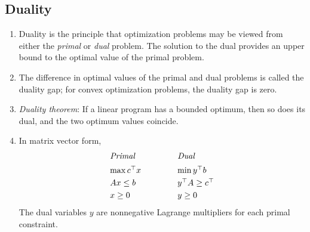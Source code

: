 \documentclass[10pt]{article}
\begin{document}
\begin{multicols}{2}
\begin{addmargin}[0.8em]{0.5em}
    \subsection{Duality}
    \vspace{-0.2cm}
    \begin{enumerate}[label=(\alph*)]
        \item Duality is the principle that optimization problems may be viewed from either the \textit{primal} or \textit{dual} problem. The solution to the dual provides an upper bound to the optimal value of the primal problem.
        \item The difference in optimal values of the primal and dual problems is called the duality gap; for convex optimization problems, the duality gap is zero.
        \item \textit{Duality theorem}: If a linear program has a bounded optimum, then so does its dual, and the two optimum values coincide.
        \item In matrix vector form,
        \begin{align*}
        \begin{tabular}[t]{ll}
        \textit{Primal} & \hspace{1cm} \textit{Dual} \\[5pt]
        $\max{c^\top x}$ & \hspace{1cm} $\min{y^\top b}$ \\[3pt]
        $Ax \leq b$ & \hspace{1cm} $y^\top A \geq c^\top$ \\[3pt]
        $x \geq 0$ & \hspace{1cm} $y \geq 0$
        \end{tabular}
        \end{align*}
        The dual variables $y$ are nonnegative Lagrange multipliers for each primal constraint. 
    \end{enumerate}
    \vspace{-0.5cm}

\end{addmargin}
\end{multicols}
\end{document}

